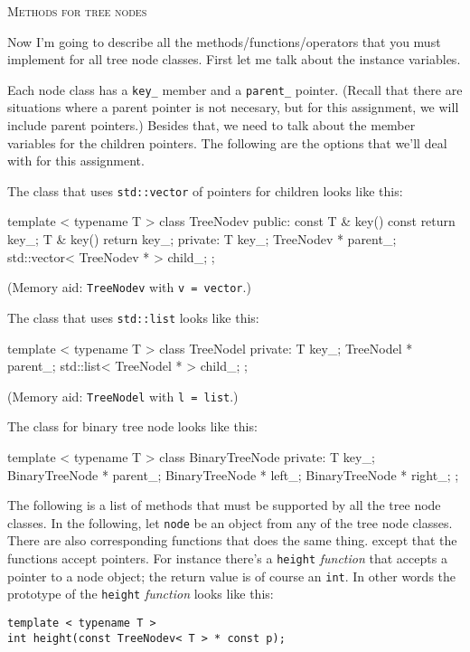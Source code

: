 \textsc{Methods for tree nodes}

Now I'm going to describe all the methods/functions/operators
that you must implement for all tree node classes.
First let me talk about the instance variables.

Each node class has a \verb!key_! member and a \verb!parent_! 
pointer. (Recall that there are situations where a parent pointer
is not necesary, but for this assignment, we will include parent
pointers.)
Besides that, we need to talk about the member variables
for the children pointers.
The following are the options that we'll deal with for this assignment.

The class that uses \verb!std::vector! of pointers for children looks like
this:
\begin{console}[commandchars=\~\!\@,fontsize=\footnotesize]
template < typename T >
class TreeNodev
{
public:
    const T & key() const
    {
        return key_;
    }
    T & key()
    {
        return key_;
    }
private:
    T key_;
    TreeNodev * parent_;
    std::vector< TreeNodev * > child_;
};
\end{console}
(Memory aid: \verb!TreeNodev! with \verb!v = vector!.)

The class that uses \verb!std::list! looks like this:
\begin{console}[fontsize=\footnotesize]
template < typename T >
class TreeNodel
{
private:
    T key_;
    TreeNodel * parent_;
    std::list< TreeNodel * > child_;
};
\end{console}
(Memory aid: \verb!TreeNodel! with \verb!l = list!.)

The class for binary tree node looks like this:
\begin{console}[fontsize=\footnotesize]
template < typename T >
class BinaryTreeNode
{
private:
    T key_;
    BinaryTreeNode * parent_;
    BinaryTreeNode * left_;
    BinaryTreeNode * right_;
};
\end{console}

The following is a list of methods that must be supported by
all the tree node classes.
In the following, let \verb!node! be an object
from any of the tree node classes.
There are also corresponding functions that does the same thing.
except that the functions accept pointers. For instance there's a
\verb!height! \textit{function} that accepts a pointer to a node object;
the return value is of course an \verb!int!.
In other words the prototype of the \verb!height! \textit{function} 
looks like this:
\begin{Verbatim}[frame=single,fontsize=\footnotesize]
template < typename T >
int height(const TreeNodev< T > * const p);
\end{Verbatim}

